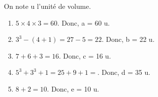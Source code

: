   On note u l'unité de volume. \\
  \begin{enumerate}
     \item $5\times4\times3 =60$. Donc, {\blue a = 60 u}.
     \item $3^{3}-(4+1) =27-5 =22$. Donc, {\blue b = 22 u}.
     \item $7+6+3 =16$. Donc, {\blue c = 16 u}.
     \item $5^{3}+3^{3}+1 =25+9+1 =$. Donc, {\blue d = 35 u}.
     \item $8+2 =10$. Donc, {\blue e = 10 u}.
  \end{enumerate}
